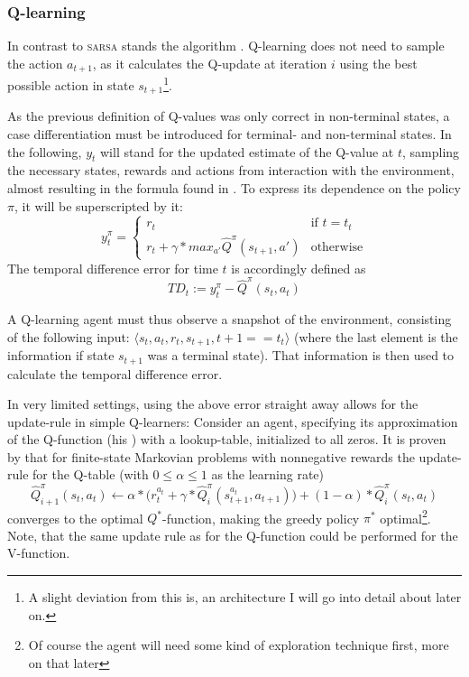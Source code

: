 \subsubsection*{Q-learning}

In contrast to \textsc{sarsa} stands the  algorithm \cite{watkins_learning_1989}. Q-learning does not need to sample the action $a_{t+1}$, as it calculates the Q-update at iteration $i$ using the best possible action in state $s_{t+1}$\footnote{A slight deviation from this is, an architecture I will go into detail about later on.}. 

As the previous definition of Q-values was only correct in non-terminal states, a case differentiation must be introduced for terminal- and non-terminal states. In the following, $y_t$ will stand for the updated estimate of the Q-value at $t$, sampling the necessary states, rewards and actions from interaction with the environment, almost resulting in the formula found in \cite{mnih_human-level_2015}. To express its dependence on the policy $\pi$, it will be superscripted by it:
\begin{equation} \label{eq:ycases}
	y_t^\pi = \begin{cases} 
		r_t & \text{if } t = t_t\\
		r_t + \gamma * max_{a'} \hat{Q}^\pi( s_{t+1}, a') & \text{otherwise}
\end{cases}
\end{equation}
The temporal difference error for time $t$ is accordingly defined as 
\begin{equation}
TD_t := y_t^\pi - \hat{Q}^\pi(s_t, a_t)
\end{equation}

A Q-learning agent must thus observe a snapshot of the environment, consisting of the following input: $\langle s_t, a_t, r_t, s_{t+1}, t+1==t_t \rangle$ (where the last element is the information if state $s_{t+1}$ was a terminal state). That information is then used to calculate the temporal difference error.

In very limited settings, using the above error straight away allows for the update-rule in simple Q-learners: Consider an agent, specifying its approximation of the Q-function (his ) with a lookup-table, initialized to all zeros. It is proven by \cite{watkins_technical_1992} that for finite-state Markovian problems with nonnegative rewards the update-rule for the Q-table (with $0 \leq \alpha \leq 1$ as the learning rate)
\begin{equation} \label{eq:qtable}
	\hat{Q}^\pi_{i+1}(s_t,a_t) \leftarrow \alpha * \Big(r_t^{a_t} + \gamma * \hat{Q}^\pi_i(s_{t+1}^{a_t},a_{t+1}) \Big) + (1-\alpha) * \hat{Q}^\pi_i(s_t,a_t)
\end{equation}
converges to the optimal $Q^*$-function, making the greedy policy $\pi^*$ optimal\footnote{Of course the agent will need some kind of exploration technique first, more on that later}. Note, that the same update rule as for the Q-function could be performed for the V-function.\\

